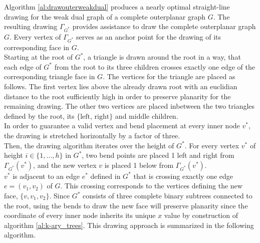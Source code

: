 Algorithm \ref{al:drawouterweakdual} produces a nearly optimal straight-line drawing for the weak dual graph of a complete outerplanar graph $G$. The resulting drawing $\Gamma_{G^*}$ provides assistance to draw the complete outerplanar graph $G$. Every vertex of $\Gamma_{G^*}$ serves as an anchor point for the drawing of its corresponding face in $G$.\\
Starting at the root of $G^*$, a triangle is drawn around the root in a way, that each edge of $G^*$ from the root to its three children crosses exactly one edge of the corresponding triangle face in $G$. The vertices for the triangle are placed as follows. The first vertex lies above the already drawn root with an euclidian distance to the root sufficiently high in order to preserve planarity for the remaining drawing. The other two vertices are placed inbetween the two triangles defined by the root, its $\{\text{left, right}\}$ and middle children.\\
In order to guarantee a valid vertex and bend placement at every inner node $v^*$, the drawing is stretched horizontally by a factor of three.\\
Then, the drawing algorithm iterates over the height of $G^*$. For every vertex $v^*$ of height $i\in \{1,...,h\}$ in $G^*$, two bend points are placed 1 \UL left and right from $\Gamma_{G^*}(v^*)$, and the new vertex $v$ is placed 1 \UL below from $\Gamma_{G^*}(v^*)$.\\
$v^*$ is adjacent to an edge $e^*$ defined in $G^*$ that is crossing exactly one edge $e = (v_1,v_2)$ of $G$. This crossing corresponds to the vertices defining the new face, $\{v, v_1, v_2\}$. Since $G^*$ consists of three complete binary subtrees connected to the root, using the bends to draw the new face will preserve planarity since the coordinate of every inner node inherits its unique $x$ value by construction of algorithm \ref{al:k-ary_trees}. This drawing approach is summarized in the following algorithm.\\
